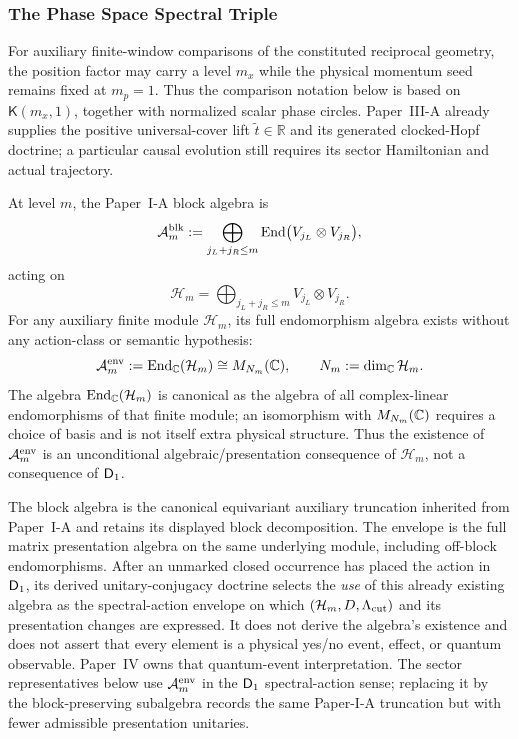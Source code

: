 \documentclass[12pt,a4paper]{article}
\begin{document}
\subsubsection{The Phase Space Spectral Triple}

For auxiliary finite-window comparisons of the constituted reciprocal geometry, the position factor may carry a level \(m_x\) while the physical momentum seed remains fixed at \(m_p=1\).  Thus the comparison notation below is based on \(\mathsf K(m_x,1)\), together with normalized scalar phase circles.  Paper~III-A already supplies the positive universal-cover lift \(\widetilde t\in\mathbb R\) and its generated clocked-Hopf doctrine; a particular causal evolution still requires its sector Hamiltonian and actual trajectory.

\begin{definition}
\label{p3:def:block-algebra-envelope}
At level \(m\), the Paper~I-A block algebra is
\[
\mathcal A_m^{\rm blk}
:=\bigoplus_{j_L+j_R\le m}\operatorname{End}\bigl(V_{j_L}\otimes V_{j_R}\bigr),
\]
acting on
\[
\mathcal H_m=\bigoplus_{j_L+j_R\le m}V_{j_L}\otimes V_{j_R}.
\]
For any auxiliary finite module \(\mathcal H_m\), its full
endomorphism algebra exists without any action-class or semantic hypothesis:
\[
\mathcal A_m^{\rm env}:=\operatorname{End}_{\mathbb{C}}(\mathcal H_m)\cong M_{N_m}(\mathbb{C}),
\qquad N_m:=\dim_{\mathbb{C}}\mathcal H_m .
\]
The algebra \(\operatorname{End}_{\mathbb{C}}(\mathcal H_m)\) is canonical as the algebra of all
complex-linear endomorphisms of that finite module; an isomorphism with
\(M_{N_m}(\mathbb{C})\) requires a choice of basis and is not itself extra physical
structure.  Thus the existence of \(\mathcal A_m^{\rm env}\) is an
unconditional algebraic/presentation consequence of \(\mathcal H_m\), not a
consequence of \(\mathsf{D}_1\).

The block algebra is the canonical equivariant auxiliary truncation inherited from
Paper~I-A and retains its displayed block decomposition.  The envelope is the
full matrix presentation algebra on the same underlying module, including
off-block endomorphisms.  After an unmarked closed occurrence has placed the
action in \(\mathsf{D}_1\), its derived unitary-conjugacy doctrine selects the
\emph{use} of this already existing algebra as the spectral-action envelope on
which \((\mathcal H_m,D,\Lambda_{\mathrm{cut}})\) and its presentation changes are expressed.
It does not derive the algebra's existence and does not assert that every
element is a physical yes/no event, effect, or quantum observable.  Paper~IV
owns that quantum-event interpretation.  The sector representatives below use
\(\mathcal A_m^{\rm env}\) in the \(\mathsf{D}_1\) spectral-action sense; replacing it
by the block-preserving subalgebra records the same Paper-I-A truncation but with
fewer admissible presentation unitaries.


\end{definition}
\end{document}

